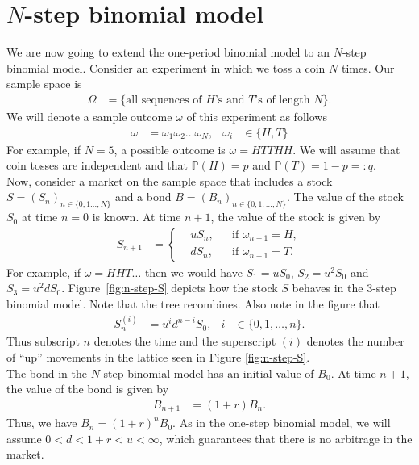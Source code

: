 \documentclass[12pt]{book}
\numberwithin{equation}{chapter}
\theoremstyle{plain}
\numberwithin{theorem}{section}
\theoremstyle{definition}
\numberwithin{exercise}{chapter}
\newcommand{\<}{\langle}
\renewcommand{\>}{\rangle}
\renewcommand{\(}{\left(}
\renewcommand{\)}{\right)}
\renewcommand{\[}{\left[}
\renewcommand{\]}{\right]}
\newcommand\Pb{\mathds{P}}
\newcommand\om{\omega}
\newcommand\Om{\Omega}
\theoremstyle{definition}
\numberwithin{question}{section}
\begin{document}
\section{$N$-step binomial model}
We are now going to extend the one-period binomial model to an $N$-step binomial model.
Consider an experiment in which we toss a coin $N$ times.  Our sample space is
\begin{align}
\Om
	&=	\{ \text{all sequences of $H$'s and $T$'s of length $N$} \} .
\end{align}
We will denote a sample outcome $\om$ of this experiment as follows
\begin{align}
\om
	&=	\om_1 \om_2 \ldots \om_N , &
\om_i
	&\in \{ H, T \}
\end{align}
For example, if $N = 5$, a possible outcome is $\om = H T T H H$.
We will assume that coin tosses are independent and that $\Pb(H) = p$ and $\Pb(T) = 1-p =:q$.
\\[0.5em]
Now, consider a market on the sample space that includes a stock $S = (S_n)_{n \in \{0,1 \ldots,N\}}$ and a bond $B = (B_n)_{n \in \{0,1,\ldots,N\}}$.  The value of the stock $S_0$ at time $n=0$ is known.  At time $n+1$, the value of the stock is given by
\begin{align}
S_{n+1}
	&=	\left\{ \begin{aligned}
			&u S_n , & &\text{if $\om_{n+1} = H$} , \\
			&d S_n , & &\text{if $\om_{n+1} = T$} .
			\end{aligned} \right.
\end{align}
For example, if $\om = HHT\ldots$ then we would have $S_1 = u S_0$, $S_2 = u^2 S_0$ and $S_3 = u^2 d S_0$.  Figure~\ref{fig:n-step-S} depicts how the stock $S$ behaves in the $3$-step binomial model.  Note that the tree recombines.  Also note in the figure that
\begin{align}
S_n^{(i)}
	&=	u^i d^{n-i} S_0 , &
i
	&\in \{0, 1, \ldots, n \} . \label{eq:Sni}
\end{align} 
Thus subscript $n$ denotes the time and the superscript $(i)$ denotes the number of ``up'' movements in the lattice seen in Figure \ref{fig:n-step-S}.
\\[0.5em]
The bond in the $N$-step binomial model has an initial value of $B_0$.  At time $n+1$, the value of the bond is given by
\begin{align}
B_{n+1}
	&=	(1 + r) B_n .
\end{align}
Thus, we have $B_n = (1+r)^n B_0$.  As in the one-step binomial model, we will assume $0 < d < 1+r < u < \infty$, which guarantees that there is no arbitrage in the market.
\end{document}
